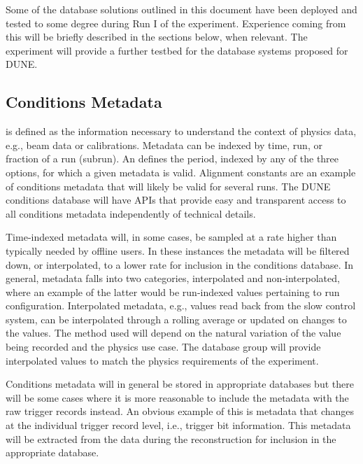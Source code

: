 \documentclass[../main-v1.tex]{subfiles}
\begin{document}
Some of the database solutions outlined in this document have been deployed and tested to some degree during Run I of the  experiment. Experience coming from %
this will be briefly described in the sections below, when relevant. %
The  experiment will provide a further testbed for the database systems proposed for DUNE.  

\subsection{Conditions Metadata}
\label{subsec:db:conditions_metadata} 

is defined as the information necessary to understand the context of physics data, e.g., beam data or calibrations.
Metadata can be indexed by %
time, run, or fraction of a run (subrun). 
An 
defines the period, indexed by any of the three options, for which a given metadata is valid.
Alignment constants are an example of conditions metadata that will likely be valid for several runs. 
The DUNE conditions database will have APIs that provide easy and transparent access to all conditions metadata independently of technical details.

Time-indexed metadata will, in some cases, be sampled at a rate higher than typically needed by offline users. In these instances the metadata will be filtered down, or interpolated, to a lower rate for inclusion in the conditions database. In general, metadata falls into two categories, interpolated and non-interpolated, where an example of the latter would be run-indexed values pertaining to run configuration. Interpolated metadata, e.g., values read back from the slow control system, can be interpolated through a rolling average or updated on changes to the values. The method used will depend on the natural variation of the value being recorded and the physics use case. 
The database group will provide interpolated values to match the physics requirements of the experiment.  

Conditions metadata will in general be stored in appropriate databases but there will be some cases where it is more reasonable to include the metadata with the raw trigger records instead. An obvious example of this is metadata that changes at the individual trigger record level, i.e., trigger bit information. This metadata will be extracted from the data during the reconstruction for inclusion in the appropriate database. 
\end{document}
